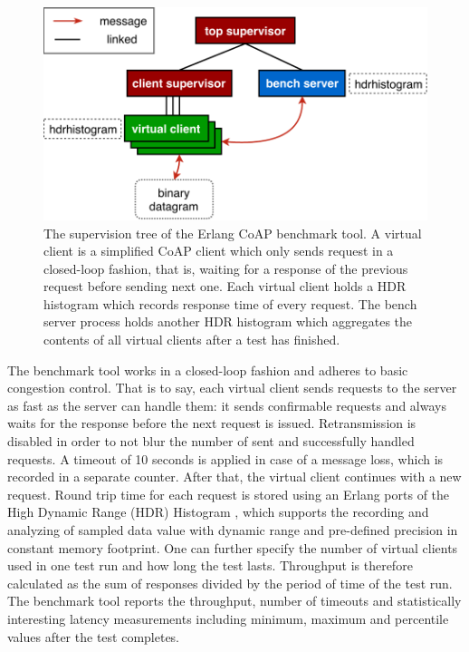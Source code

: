 \begin{figure}[!htbp]
\centering
\includegraphics[scale = 0.7]{ecoap_bench_arch}
\caption[The supervision tree of the Erlang CoAP benchmark tool]{The supervision tree of the Erlang CoAP benchmark tool. A virtual client is a simplified CoAP client which only sends request in a closed-loop fashion, that is, waiting for a response of the previous request before sending next one. Each virtual client holds a HDR histogram which records response time of every request. The bench server process holds another HDR histogram which aggregates the contents of all virtual clients after a test has finished.}
\label{fig:ecoap_bench_arch}
\end{figure}

The benchmark tool works in a closed-loop fashion and adheres to basic congestion control. That is to say, each virtual client sends requests to the server as fast as the server can handle them: it sends confirmable requests and always waits for the response before the next request is issued. Retransmission is disabled in order to not blur the number of sent and successfully handled requests. A timeout of 10 seconds is applied in case of a message loss, which is recorded in a separate counter. After that, the virtual client continues with a new request. Round trip time for each request is stored using an Erlang ports of the High Dynamic Range (HDR) Histogram \autocite{hdr_erl}, which supports the recording and analyzing of sampled data value with dynamic range and pre-defined precision in constant memory footprint. One can further specify the number of virtual clients used in one test run and how long the test lasts. Throughput is therefore calculated as the sum of  responses divided by the period of time of the test run. The benchmark tool reports the throughput, number of timeouts and statistically interesting latency measurements including minimum, maximum and percentile values after the test completes.

